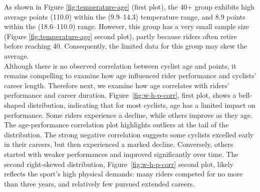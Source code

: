 \documentclass[a4paper, twoside]{article}
\begin{document}
As shown in Figure \ref{fig:temperature-age} (first plot), the 40+ group exhibits high average points (110.0) within the (9.9--14.3) temperature range, and 8.9 points within the (18.6--110.0) range. However, this group has a very small sample size (Figure \ref{fig:temperature-age} second plot), partly because riders often retire before reaching 40. Consequently, the limited data for this group may skew the average.
 \\
Although there is no observed correlation between cyclist age and points, it remains compelling to examine how age influenced rider performance and cyclists' career length.
Therefore next, we examine how age correlates with riders' performance and career duration. Figure~\ref{fig:w-h-p-corr}, first plot, shows a bell-shaped distribution, indicating that for most cyclists, age has a limited impact on performance. Some riders experience a decline, while others improve as they age.
The age-performance correlation plot highlights outliers at the tail of the distribution. The strong negative correlation suggests some cyclists excelled early in their careers, but then experienced a marked decline. Conversely, others started with weaker performances and improved significantly over time.
The second right-skewed distribution, Figure~\ref{fig:w-h-p-corr} second plot, likely reflects the sport's high physical demands: many riders competed for no more than three years, and relatively few pursued extended careers.
\end{document}

